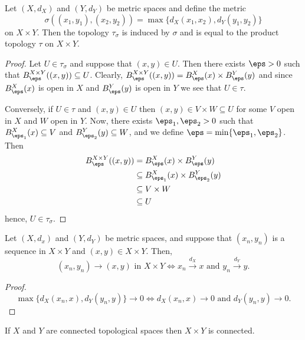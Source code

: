 \documentclass[12pt, a4paper]{article}
\begin{document}
\begin{mdthm}
    Let \((X,d_X)\) and \((Y,d_Y)\) be metric spaces and define the metric 
    \[\sigma((x_1,y_1),(x_2,y_2)) = \max\{d_X(x_1,x_2),d_Y(y_1,y_2)\}\]
    on \(X \times Y\). Then the topology \(\tau_{\sigma}\) is induced by \(\sigma\) and is equal to the product topology \(\tau\) on \(X \times Y\).
\end{mdthm}

\begin{proof}
    Let \(U \in \tau_{\sigma}\) and suppose that \((x,y) \in U\). Then there exists \(\eps>0\) such that \(B_{\eps}^{X \times Y}((x,y)) \subseteq U\). Clearly, \(B_{\eps}^{X \times Y}((x,y))=B_{\eps}^X(x) \times B_{\eps}^Y(y)\) and since \(B_{\eps}^X(x)\) is open in \(X\) and \(B_{\eps}^Y(y)\) is open in \(Y\) we see that \(U \in \tau\). 

    Conversely, if \(U \in \tau\) and \((x,y) \in U\) then \((x,y) \in V \times W \subseteq U\) for some \(V\) open in \(X\) and \(W\) open in \(Y\). Now, there exists \(\eps_1,\eps_2>0\) such that \(B_{\eps_1}^X(x) \subseteq V\) and \(B_{\eps_2}^Y(y) \subseteq W\), and we define \(\eps=\min\{\eps_1,\eps_2\}\). Then
    \[\begin{aligned}
        B_{\eps}^{X\times Y}((x,y)) &= B_{\eps}^X(x) \times B_{\eps}^Y(y) \\
        &\subseteq B_{\eps_1}^X(x) \times B_{\eps_2}^Y(y) \\
        &\subseteq V \times W \\
        &\subseteq U
    \end{aligned}\]
    hence, \(U \in \tau_\sigma\).
\end{proof}

\begin{corollary}
    Let \((X,d_x)\) and \((Y,d_Y)\) be metric spaces, and suppose that \((x_n,y_n)\) is a sequence in \(X \times Y\) and \((x,y) \in X \times Y\). Then, 
    \[(x_n,y_n) \to (x,y) \text{ in } X \times Y \iff x_n \xrightarrow{d_X} x \text{ and } y_n \xrightarrow{d_Y} y.\]
\end{corollary}

\begin{proof}
    \[\max\{d_X(x_n,x),d_Y(y_n,y)\}\to 0 \iff d_X(x_n,x) \to 0 \text{ and } d_Y(y_n,y) \to 0.\]
\end{proof}

\begin{mdthm}
    If \(X\) and \(Y\) are connected topological spaces then \(X \times Y\) is connected.
\end{mdthm}
\end{document}
